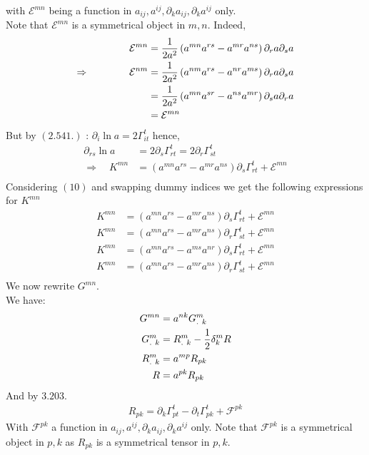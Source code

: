 with $\mathcal{E}^{mn}$ being a function in  $a_{ij}, a^{ij}, \partial_k a_{ij}, \partial_k a^{ij}$ only.\\
Note that $\mathcal{E}^{mn}$ is a symmetrical object in $m,n$. Indeed,
\begin{align}
\mathcal{E}^{mn} &= \frac{1}{2a^2}\left( a^{mn}a^{rs}-a^{mr}a^{ns} \right)\partial_r a\partial_s a\\
\Rightarrow\quad\quad\quad\quad \mathcal{E}^{nm} &= \frac{1}{2a^2}\left( a^{nm}a^{rs}-a^{nr}a^{ms} \right)\partial_r a\partial_s a\\
&= \frac{1}{2a^2}\left( a^{mn}a^{sr}-a^{ns}a^{mr} \right)\partial_s a\partial_r a\\
&= \mathcal{E}^{mn}
\end{align}
But by $(2.541.)$ : $\partial_i \ln a = 2\Gamma^t_{it}$
hence,
\begin{align}
\partial_{rs} \ln a &= 2\partial_{s}\Gamma^t_{rt} = 2\partial_{r}\Gamma^t_{st}\\
\Rightarrow\quad K^{mn} &= \left( a^{mn}a^{rs}-a^{mr}a^{ns} \right)\partial_{s}\Gamma^t_{rt}+\mathcal{E}^{mn}\\
\end{align}
Considering $(10)$ and  swapping dummy indices we get the following expressions for $K^{mn}$
\begin{align}
K^{mn} &= \left( a^{mn}a^{rs}-a^{mr}a^{ns} \right)\partial_{s}\Gamma^t_{rt}+\mathcal{E}^{mn}\\
K^{mn} &= \left( a^{mn}a^{rs}-a^{mr}a^{ns} \right)\partial_{r}\Gamma^t_{st}+\mathcal{E}^{mn}\\
K^{mn} &= \left( a^{mn}a^{rs}-a^{ms}a^{nr} \right)\partial_{s}\Gamma^t_{rt}+\mathcal{E}^{mn}\\
K^{mn} &= \left( a^{mn}a^{rs}-a^{mr}a^{ns} \right)\partial_{r}\Gamma^t_{st}+\mathcal{E}^{mn}\\
\end{align}
We now rewrite $G^{mn}$. \\
We have:
\begin{align}
G^{mn} &= a^{nk}G^m_{. \ k}\\
G^m_{. \ k} &= R^m_{. \ k}-\frac{1}{2}\delta^m_k R\\
R^m_{. \ k} &= a^{mp} R_{pk}\\
R &= a^{pk}R_{pk}
\end{align}
And by $3.203.$
\begin{align}
R_{pk} = \partial_k \Gamma^t_{pt} - \partial_t \Gamma^t_{pk} + \mathcal{F}^{pk}
\end{align}
With $\mathcal{F}^{pk}$ a function in  $a_{ij}, a^{ij}, \partial_k a_{ij}, \partial_k a^{ij}$ only. Note that $\mathcal{F}^{pk}$ is a symmetrical object in $p,k$ as $R_{pk}$ is a symmetrical tensor in $p,k$.
